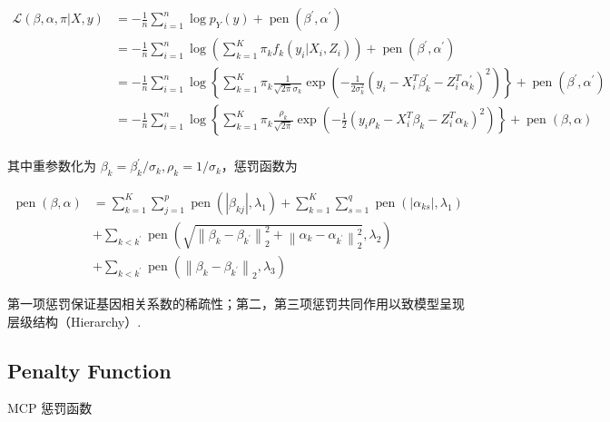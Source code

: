 \documentclass[12pt, a4paper, oneside]{article}
\numberwithin{equation}{section}
\begin{document}
\begin{equation}
	\begin{aligned}
		\mathcal{L}(\beta,\alpha, \pi | X, y) &= -\frac1n\sum_{i=1}^{n}\log{p_Y(y)} + \operatorname{pen}(\beta^\prime, \alpha^\prime)\\
		&= -\frac1n\sum_{i=1}^{n}\log{(\sum_{k=1}^{K}\pi_k f_k(y_i|X_i, Z_i))} + \operatorname{pen}(\beta^\prime, \alpha^\prime)\\
		&= -\frac1n\sum_{i=1}^{n}\log\left\lbrace \sum_{k=1}^{K}\pi_k \frac{1}{\sqrt{2\pi}\sigma_k} \exp\left(   -\frac{1}{2\sigma_k^2}   \left(y_i - X_i^T \beta^\prime_k - Z_i^T \alpha^\prime_k \right)^2      \right)  \right\rbrace + \operatorname{pen}(\beta^\prime, \alpha^\prime)\\
		&= -\frac1n\sum_{i=1}^{n}\log\left\lbrace \sum_{k=1}^{K}\pi_k \frac{\rho_k}{\sqrt{2\pi}} \exp\left(   -\frac{1}{2}   \left(y_i\rho_k - X_i^T \beta_k - Z_i^T \alpha_k \right)^2      \right)  \right\rbrace  + \operatorname{pen}(\beta, \alpha)\\
	\end{aligned}
	\label{eq:object}
\end{equation}

其中重参数化为 $\beta_k = \beta_k^\prime / \sigma_k, \rho_k = 1/\sigma_k$，惩罚函数为

\begin{equation}
	\begin{aligned}
		\operatorname{pen}(\beta, \alpha)
		&=\sum_{k=1}^{K}\sum_{j=1}^{p} \operatorname{pen}\left(|\beta_{kj}|, \lambda_{1}\right) + \sum_{k=1}^{K}\sum_{s=1}^{q} \operatorname{pen}\left(|\alpha_{ks}|, \lambda_{1}\right)\\
		&+\sum_{k<k^{\prime}} \operatorname{pen}\left(\sqrt{\left\|\beta_{k}-\beta_{k^{\prime}}\right\|_{2}^{2}+\left\|\alpha_{k}-\alpha_{k^{\prime}}\right\|_{2}^{2}}, \lambda_{2}\right) \\
		&+\sum_{k<k^{\prime}} \operatorname{pen}\left(\left\|\beta_{k}-\beta_{k^{\prime}}\right\|_{2}, \lambda_{3}\right)
	\end{aligned}
	\label{eq:penalty}
\end{equation}

第一项惩罚保证基因相关系数的稀疏性；第二，第三项惩罚共同作用以致模型呈现层级结构（Hierarchy）.

\subsection{Penalty Function}

MCP 惩罚函数
\end{document}
